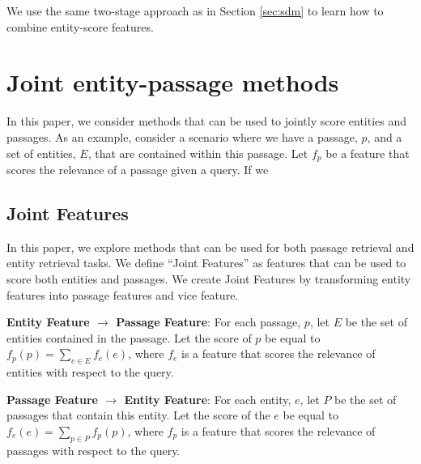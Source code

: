 \documentclass{article}
\begin{document}
We use the same two-stage approach as in Section \ref{sec:sdm} to learn how to combine entity-score features.



\section{Joint entity-passage methods}

In this paper, we consider methods that can be used to jointly score entities and passages.
As an example, consider a scenario where we have a passage, $p$, and a set of entities, $E$, that are contained within this passage. Let $f_p$ be a feature that scores the relevance of a passage given a query. If we

\subsection{Joint Features}\label{sec:joint}
In this paper, we explore methods that can be used for both passage retrieval and entity retrieval tasks.
We define ``Joint Features'' as features that can be used to score both entities and passages.
We create Joint Features by transforming entity features into passage features and vice feature.

\textbf{Entity Feature $\rightarrow$ Passage Feature}: For each passage, $p$, let $E$ be the set of entities contained in the passage. Let the score of $p$ be equal to $f_p(p) = \sum_{e \in E}{f_e(e)}$, where $f_e$ is a feature that scores the relevance of entities with respect to the query.

\textbf{Passage Feature $\rightarrow$ Entity Feature}: For each entity, $e$, let $P$ be the set of passages that contain this entity. Let the score of the $e$ be equal to $f_e(e) = \sum_{p \in P}{f_p(p)}$, where $f_p$ is a feature that scores the relevance of passages with respect to the query.


\end{document}
